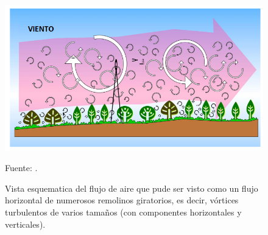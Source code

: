 \begin{figure}[ht!]
\centering
	\includegraphics[scale=0.78]{Images/wang01.png}
	\caption{Vista esquematica del flujo de aire que pude ser visto como un flujo horizontal de numerosos remolinos giratorios, es decir, vórtices turbulentos de varios tamaños (con componentes horizontales y verticales).}
	Fuente: \citet{wang2012review}.
	\label{fig:wang01}
\end{figure}
